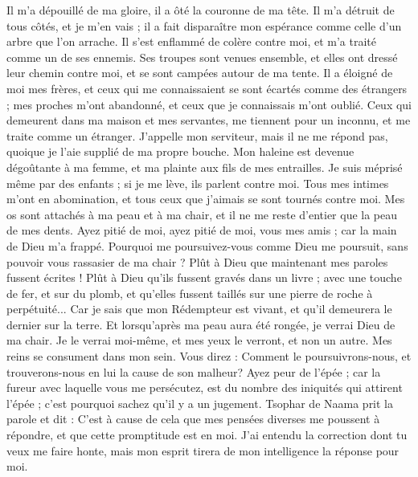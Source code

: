 \begin{multicols}{2}
Il m'a dépouillé de ma gloire, il a ôté la couronne de ma tête.
Il m'a détruit de tous côtés, et je m'en vais ; il a fait disparaître mon espérance comme celle d'un arbre que l'on arrache. 
Il s'est enflammé de colère contre moi, et m'a traité comme un de ses ennemis.
Ses troupes sont venues ensemble, et elles ont dressé leur chemin contre moi, et se sont campées autour de ma tente.
Il a éloigné de moi mes frères, et ceux qui me connaissaient se sont écartés comme des étrangers ;
mes proches m'ont abandonné, et ceux que je connaissais m'ont oublié.
Ceux qui demeurent dans ma maison et mes servantes, me tiennent pour un inconnu, et me traite comme un étranger. 
J'appelle mon serviteur, mais il ne me répond pas, quoique je l'aie supplié de ma propre bouche.
Mon haleine est devenue dégoûtante à ma femme, et ma plainte aux fils de mes entrailles.
Je suis méprisé même par des enfants ; si je me lève, ils parlent contre moi.
Tous mes intimes m'ont en abomination, et tous ceux que j'aimais se sont tournés contre moi.
Mes os sont attachés à ma peau et à ma chair, et il ne me reste d'entier que la peau de mes dents.
Ayez pitié de moi, ayez pitié de moi, vous mes amis ; car la main de Dieu m'a frappé.
Pourquoi me poursuivez-vous comme Dieu me poursuit, sans pouvoir vous rassasier de ma chair ? 
Plût à Dieu que maintenant mes paroles fussent écrites ! Plût à Dieu qu'ils fussent gravés dans un livre ; 
avec une touche de fer, et sur du plomb, et qu'elles fussent taillés sur une pierre de roche à perpétuité...
Car je sais que mon Rédempteur est vivant, et qu'il demeurera le dernier sur la terre.
Et lorsqu'après ma peau aura été rongée, je verrai Dieu de ma chair.
Je le verrai moi-même, et mes yeux le verront, et non un autre. Mes reins se consument dans mon sein. 
Vous direz : Comment le poursuivrons-nous, et trouverons-nous en lui la cause de son malheur? 
Ayez peur de l'épée ; car la fureur avec laquelle vous me persécutez, est du nombre des iniquités qui attirent l'épée ; c'est pourquoi sachez qu'il y a un jugement.
\VerseOne{}Tsophar de Naama prit la parole et dit :
C'est à cause de cela que mes pensées diverses me poussent à répondre, et que cette promptitude est en moi. 
J'ai entendu la correction dont tu veux me faire honte, mais mon esprit tirera de mon intelligence la réponse pour moi. 

\end{multicols}
